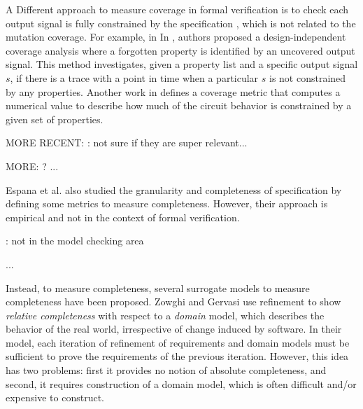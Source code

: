 A Different approach to measure coverage in formal verification is to check each output signal is fully constrained by the specification \cite{das2005formal, claessen2007coverage, grosse2007estimating}, which is not related to the mutation coverage. For example, in In \cite{claessen2007coverage}, authors proposed a design-independent coverage analysis where a forgotten property is identified by an uncovered output signal. This method investigates, given a property list and a specific output signal $s$, if there is a trace with a point in time when a particular $s$ is not constrained by any properties. Another work in \cite{haedicke2012guiding} defines a coverage metric that computes a numerical value to describe how much of the circuit behavior is constrained by a given set of properties.

MORE RECENT: \cite{yang2013minimal} \cite{chockler2011incremental} \cite{brillout2009mutation} \cite{bao2014coverage}: not sure if they are super relevant...

MORE:
\cite{Kupferman:2006:SCF} ? ...

Espana et al. \cite{espana2009evaluating} also studied the granularity and completeness of specification by defining some metrics to measure completeness. However, their approach is empirical and not in the context of formal verification.

\cite{drechsler2012completeness, firesmith2005your, chang2007finding,katta2013investigating, zowghi2002three} : not in the model checking area

\cite{Whalen07:FMICS} ...

Instead, to measure completeness, several surrogate models to measure completeness have been proposed.  Zowghi and Gervasi use refinement to show {\em relative completeness} with respect to a {\em domain} model, which describes the behavior of the real world, irrespective of change induced by software.  In their model, each iteration of refinement of requirements and domain models must be sufficient to prove the requirements of the previous iteration.  However, this idea has two problems: first it provides no notion of absolute completeness, and second, it requires construction of a domain model, which is often difficult and/or expensive to construct.

